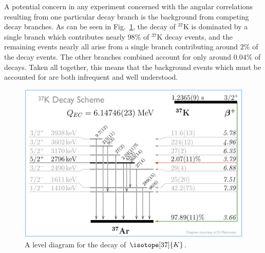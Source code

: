 A potential concern in any experiment concerned with the angular correlations resulting from one particular decay branch is the background from competing decay branches.  As can be seen in Fig.~\ref{fig:nuclearleveldiagram}, the decay of $^{37}\textrm{K}$ is dominated by a single branch which contributes nearly $98\%$ of $^{37}\textrm{K}$ decay events, and the remaining events nearly all arise from a single branch contributing around $2\%$ of the decay events.  The other branches combined account for only around $0.04\%$ of decays.  Taken all together, this means that the background events which must be accounted for are both infrequent and well understood.

\begin{figure}[h!tb]
	\centering
	\includegraphics[width=.999\linewidth]
	{Figures/NuclearLevelDiagram.png}
	\caption{A level diagram for the decay of $\isotope[37]{K}$.}	
	\label{fig:nuclearleveldiagram}
\end{figure}


